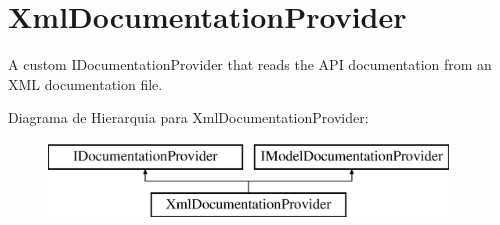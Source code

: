\hypertarget{classApi3Layers_1_1Areas_1_1HelpPage_1_1XmlDocumentationProvider}{}\section{Xml\+Documentation\+Provider}
\label{classApi3Layers_1_1Areas_1_1HelpPage_1_1XmlDocumentationProvider}


A custom I\+Documentation\+Provider that reads the A\+PI documentation from an X\+ML documentation file.  


Diagrama de Hierarquia para Xml\+Documentation\+Provider\+:\begin{figure}[H]
\begin{center}
\leavevmode
\includegraphics[height=2.000000cm]{classApi3Layers_1_1Areas_1_1HelpPage_1_1XmlDocumentationProvider}
\end{center}
\end{figure}
